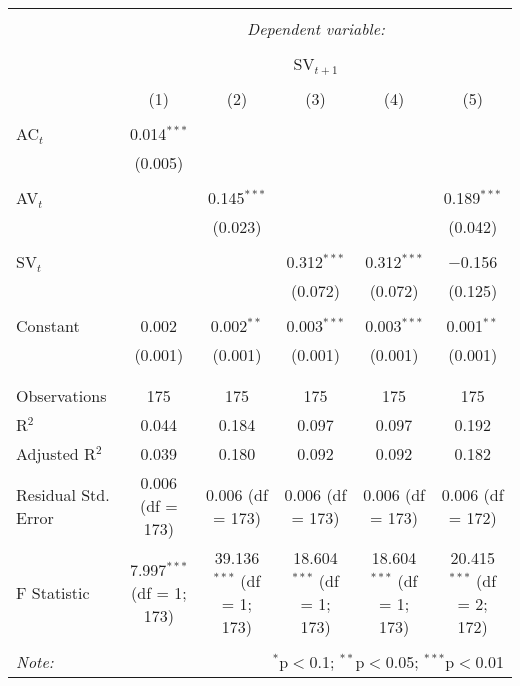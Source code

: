 
\begin{table}[!htbp] \centering 
  \caption{} 
  \label{} 
\begin{tabular}{@{\extracolsep{5pt}}lccccc} 
\\[-1.8ex]\hline 
\hline \\[-1.8ex] 
 & \multicolumn{5}{c}{\textit{Dependent variable:}} \\ 
\cline{2-6} 
\\[-1.8ex] & \multicolumn{5}{c}{SV$_{t+1}$} \\ 
\\[-1.8ex] & (1) & (2) & (3) & (4) & (5)\\ 
\hline \\[-1.8ex] 
 AC$_{t}$ & 0.014$^{***}$ &  &  &  &  \\ 
  & (0.005) &  &  &  &  \\ 
  & & & & & \\ 
 AV$_{t}$ &  & 0.145$^{***}$ &  &  & 0.189$^{***}$ \\ 
  &  & (0.023) &  &  & (0.042) \\ 
  & & & & & \\ 
 SV$_{t}$ &  &  & 0.312$^{***}$ & 0.312$^{***}$ & $-$0.156 \\ 
  &  &  & (0.072) & (0.072) & (0.125) \\ 
  & & & & & \\ 
 Constant & 0.002 & 0.002$^{**}$ & 0.003$^{***}$ & 0.003$^{***}$ & 0.001$^{**}$ \\ 
  & (0.001) & (0.001) & (0.001) & (0.001) & (0.001) \\ 
  & & & & & \\ 
\hline \\[-1.8ex] 
Observations & 175 & 175 & 175 & 175 & 175 \\ 
R$^{2}$ & 0.044 & 0.184 & 0.097 & 0.097 & 0.192 \\ 
Adjusted R$^{2}$ & 0.039 & 0.180 & 0.092 & 0.092 & 0.182 \\ 
Residual Std. Error & 0.006 (df = 173) & 0.006 (df = 173) & 0.006 (df = 173) & 0.006 (df = 173) & 0.006 (df = 172) \\ 
F Statistic & 7.997$^{***}$ (df = 1; 173) & 39.136$^{***}$ (df = 1; 173) & 18.604$^{***}$ (df = 1; 173) & 18.604$^{***}$ (df = 1; 173) & 20.415$^{***}$ (df = 2; 172) \\ 
\hline 
\hline \\[-1.8ex] 
\textit{Note:}  & \multicolumn{5}{r}{$^{*}$p$<$0.1; $^{**}$p$<$0.05; $^{***}$p$<$0.01} \\ 
\end{tabular} 
\end{table} 
